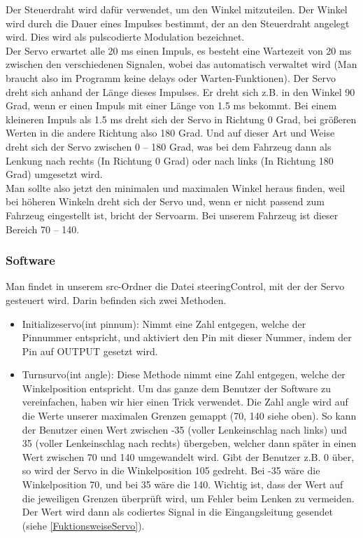         Der Steuerdraht wird dafür verwendet, um den Winkel mitzuteilen. Der Winkel wird durch die Dauer eines Impulses bestimmt, der an den Steuerdraht angelegt wird. Dies wird als pulscodierte Modulation bezeichnet.\\
        
        Der Servo erwartet alle 20 ms einen Impuls, es besteht eine Wartezeit von 20 ms zwischen den verschiedenen Signalen, wobei das automatisch verwaltet wird (Man braucht also im Programm keine delays oder Warten-Funktionen). Der Servo dreht sich anhand der Länge dieses Impulses. Er dreht sich z.B. in den Winkel 90 Grad, wenn er einen Impuls mit einer Länge von 1.5 ms bekommt. Bei einem kleineren Impuls als 1.5 ms dreht sich der Servo in Richtung 0 Grad, bei größeren Werten in die andere Richtung also 180 Grad. Und auf dieser Art und Weise dreht sich der Servo zwischen 0 – 180 Grad, was bei dem Fahrzeug dann als Lenkung nach rechts (In Richtung 0 Grad) oder nach links (In Richtung 180 Grad) umgesetzt wird.\\
        
        Man sollte also jetzt den minimalen und maximalen Winkel heraus finden, weil bei höheren Winkeln dreht sich der Servo und, wenn er nicht passend zum Fahrzeug eingestellt ist, bricht der Servoarm.
        Bei unserem Fahrzeug ist dieser Bereich 70 – 140.\\
        
    \subsubsection{Software}
        Man findet in unserem src-Ordner die Datei steeringControl, mit der der Servo gesteuert wird.
        Darin befinden sich zwei Methoden.
        \begin{itemize}
        	
            \item Initializeservo(int pinnum): Nimmt eine Zahl entgegen, welche der Pinnummer entspricht, und aktiviert den Pin mit dieser Nummer, indem der Pin auf OUTPUT gesetzt wird.
            
            \item Turnsurvo(int angle): Diese Methode nimmt eine Zahl entgegen, welche der Winkelposition entspricht. Um das ganze dem Benutzer der Software zu vereinfachen, haben wir hier einen Trick verwendet. Die Zahl angle wird auf die Werte unserer maximalen Grenzen gemappt (70, 140 siehe oben). So kann der Benutzer einen Wert zwischen -35 (voller Lenkeinschlag nach links) und 35 (voller Lenkeinschlag nach rechts) übergeben, welcher dann später in einen Wert zwischen 70 und 140 umgewandelt wird. Gibt der Benutzer z.B. 0 über, so wird der Servo in die Winkelposition 105 gedreht. Bei -35 wäre die Winkelposition 70, und bei 35 wäre die 140.
            Wichtig ist, dass der Wert auf die jeweiligen Grenzen überprüft wird, um Fehler beim Lenken zu vermeiden.
            Der Wert wird dann als codiertes Signal in die Eingangsleitung gesendet (siehe \autoref{FuktionsweiseServo}).
            
        \end{itemize}

